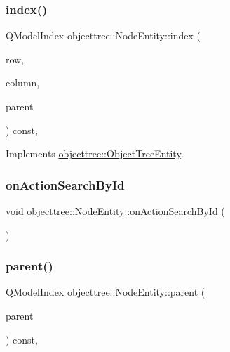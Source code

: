 \mbox{\label{classobjecttree_1_1_node_entity_a2ad069b13c5ce29c4239acd2c4eeda24}} 
\subsubsection{\texorpdfstring{index()}{index()}}
{\footnotesize\ttfamily Q\+Model\+Index objecttree\+::\+Node\+Entity\+::index (\begin{DoxyParamCaption}\item[{int}]{row,  }\item[{int}]{column,  }\item[{const Q\+Model\+Index \&}]{parent }\end{DoxyParamCaption}) const\hspace{0.3cm}{\ttfamily [override]}, {\ttfamily [virtual]}}



Implements \mbox{\hyperlink{classobjecttree_1_1_object_tree_entity_a9ccaab3b27e65b1ed8b22f00c57a1082}{objecttree\+::\+Object\+Tree\+Entity}}.

\mbox{\label{classobjecttree_1_1_node_entity_a6338fd028cc29a193c11efd0a1ae3e24}} 
\subsubsection{\texorpdfstring{onActionSearchById}{onActionSearchById}}
{\footnotesize\ttfamily void objecttree\+::\+Node\+Entity\+::on\+Action\+Search\+By\+Id (\begin{DoxyParamCaption}{ }\end{DoxyParamCaption})\hspace{0.3cm}{\ttfamily [slot]}}

\mbox{\label{classobjecttree_1_1_node_entity_aa55851c6cec05dad2f9e4b0705eafa68}} 
\subsubsection{\texorpdfstring{parent()}{parent()}}
{\footnotesize\ttfamily Q\+Model\+Index objecttree\+::\+Node\+Entity\+::parent (\begin{DoxyParamCaption}\item[{const Q\+Model\+Index \&}]{parent }\end{DoxyParamCaption}) const\hspace{0.3cm}{\ttfamily [override]}, {\ttfamily [virtual]}}



